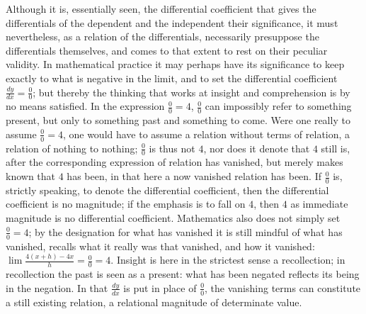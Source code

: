 \documentclass[12pt,a4paper,openany]{book}
\newcommand{\opage}[1]{\marginnote{\footnotesize\textit{[#1]}}}
\begin{document}
Although it is, essentially seen, the differential coefficient
that gives the differentials of the dependent and the independent
their significance, it must nevertheless, as a relation of the differentials,
necessarily presuppose the differentials themselves, and comes
to that extent to rest on their peculiar validity.
In mathematical practice it may perhaps have its
significance to keep exactly to what is negative in the limit,
and to set the differential coefficient $\frac{dy}{dx}=\frac{0}{0}$; but thereby
the thinking that works at insight and comprehension is
by no means satisfied. In the expression $\frac{0}{0}=4$, $\frac{0}{0}$ can impossibly refer to something present, but only to something past
and something to come. Were one really to assume $\frac{0}{0}=4$, one would have to assume a relation without terms of relation, a relation
of nothing to nothing; $\frac{0}{0}$ is thus not $4$, nor does it denote that $4$ still is, after the corresponding expression of relation has vanished, but merely makes known that $4$ has been,
\setcounter{footnote}{0}%
\opage{85}in that here a now vanished relation has been. If $\frac{0}{0}$ is, strictly
speaking, to denote the differential coefficient, then the differential coefficient
is no magnitude; if the emphasis is to fall on $4$, then $4$ as immediate magnitude is no differential coefficient.
Mathematics also does not simply set $\frac{0}{0}=4$; by the designation for what has vanished it is still mindful of
what has vanished, recalls what it really was that vanished, and how it vanished: $\lim\frac{4(x+h)-4x}{h}=\frac{0}{0}=4$. Insight is here in the strictest sense a recollection;
in recollection the past is seen as a present:
what has been negated reflects its being in the negation. In that $\frac{dy}{dx}$ is put in place of $\frac{0}{0}$, the vanishing terms can constitute a
still existing relation, a relational magnitude of determinate
value.
\end{document}
